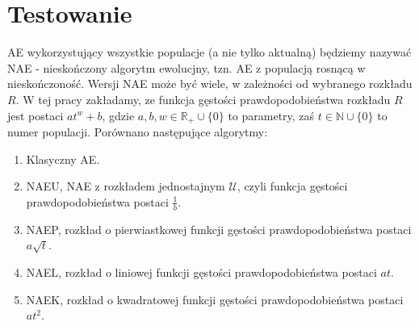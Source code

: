 \documentclass[12pt, a4paper]{article}
\begin{document}
\section{Testowanie}

AE wykorzystujący wszystkie populacje (a nie tylko aktualną) będziemy nazywać NAE - nieskończony algorytm ewolucjny, 
tzn. AE z populacją rosnącą w nieskończoność.
Wersji NAE może być wiele, w zależności od wybranego rozkładu $R$. 
W tej pracy zakładamy, ze funkcja gęstości prawdopodobieństwa rozkładu $R$ jest postaci $at^w + b$, gdzie
$a, b, w \in \mathbb{R_+} \cup \{0\}$ to parametry, zaś $t \in \mathbb{N} \cup \{0\}$ to numer populacji. 
Porównano następujące algorytmy:

\begin{enumerate}
 \item Klasyczny AE.
 \item NAEU, NAE z rozkładem jednostajnym $\mathcal{U}$, czyli funkcja gęstości prawdopodobieństwa postaci $\frac{1}{b}$. 
 \item NAEP, rozkład o pierwiastkowej funkcji gęstości prawdopodobieństwa postaci $a\sqrt{t}$.
 \item NAEL, rozkład o liniowej funkcji gęstości prawdopodobieństwa postaci $at$.
 \item NAEK, rozkład o kwadratowej funkcji gęstości prawdopodobieństwa postaci $at^2$.
\end{enumerate}
\end{document}
